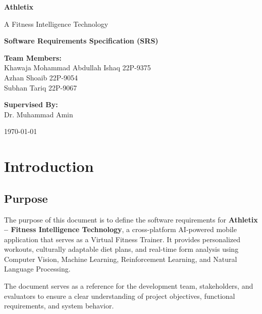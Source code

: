 \documentclass[12pt,a4paper]{article}
\begin{document}
\begin{titlepage}
    \centering
    \vspace*{2cm}
    
    {\Huge\bfseries Athletix\par}
    \vspace{0.5cm}
    {\Large A Fitness Intelligence Technology\par}
    \vspace{2cm}
    
    {\Large\bfseries Software Requirements Specification (SRS)\par}
    \vspace{3cm}
    
    {\large
    \textbf{Team Members:}\\[0.5cm]
    Khawaja Mohammad Abdullah Ishaq \quad 22P-9375\\
    Azhan Shoaib \quad 22P-9054\\
    Subhan Tariq \quad 22P-9067\\
    \vspace{1cm}
    
    \textbf{Supervised By:}\\[0.5cm]
    Dr. Muhammad Amin\\
    }
    
    \vfill
    
    {\large \today\par}
\end{titlepage}

\tableofcontents
\newpage

\section{Introduction}

\subsection{Purpose}
The purpose of this document is to define the software requirements for \textbf{Athletix – Fitness Intelligence Technology}, a cross-platform AI-powered mobile application that serves as a Virtual Fitness Trainer. It provides personalized workouts, culturally adaptable diet plans, and real-time form analysis using Computer Vision, Machine Learning, Reinforcement Learning, and Natural Language Processing.

The document serves as a reference for the development team, stakeholders, and evaluators to ensure a clear understanding of project objectives, functional requirements, and system behavior.
\end{document}

